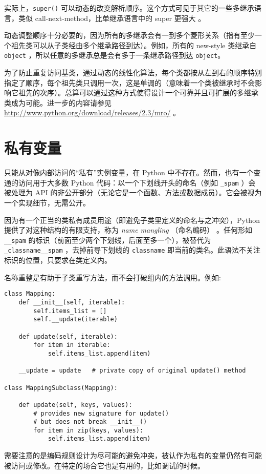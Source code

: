 实际上，\texttt{super()} 可以动态的改变解析顺序。这个方式可见于其它的一些多继承语言，类似 call-next-method，比单继承语言中的 super 更强大 。

动态调整顺序十分必要的，因为所有的多继承会有一到多个菱形关系（指有至少一个祖先类可以从子类经由多个继承路径到达）。例如，所有的 new-style 类继承自 \texttt{object} ，所以任意的多继承总是会有多于一条继承路径到达 \texttt{object}。

为了防止重复访问基类，通过动态的线性化算法，每个类都按从左到右的顺序特别指定了顺序，每个祖先类只调用一次，这是单调的（意味着一个类被继承时不会影响它祖先的次序）。总算可以通过这种方式使得设计一个可靠并且可扩展的多继承类成为可能。进一步的内容请参见 \url{http://www.python.org/download/releases/2.3/mro/} 。
\section{私有变量\label{Class:PrivateVar}}
只能从对像内部访问的“私有”实例变量，在 Python 中不存在。然而，也有一个变通的访问用于大多数 Python 代码：以一个下划线开头的命名（例如 \texttt{\_spam} ）会被处理为 API 的非公开部分（无论它是一个函数、方法或数据成员）。它会被视为一个实现细节，无需公开。

因为有一个正当的类私有成员用途（即避免子类里定义的命名与之冲突），Python 提供了对这种结构的有限支持，称为 \textit{name mangling} （命名编码） 。任何形如 \texttt{\_\_spam} 的标识（前面至少两个下划线，后面至多一个），被替代为 \texttt{\_classname\_\_spam} ，去掉前导下划线的 \texttt{classname} 即当前的类名。此语法不关注标识的位置，只要求在类定义内。

名称重整是有助于子类重写方法，而不会打破组内的方法调用。例如:
\begin{lstlisting}
class Mapping:
    def __init__(self, iterable):
        self.items_list = []
        self.__update(iterable)

    def update(self, iterable):
        for item in iterable:
            self.items_list.append(item)

    __update = update   # private copy of original update() method

class MappingSubclass(Mapping):

    def update(self, keys, values):
        # provides new signature for update()
        # but does not break __init__()
        for item in zip(keys, values):
            self.items_list.append(item)
\end{lstlisting}
需要注意的是编码规则设计为尽可能的避免冲突，被认作为私有的变量仍然有可能被访问或修改。在特定的场合它也是有用的，比如调试的时候。

